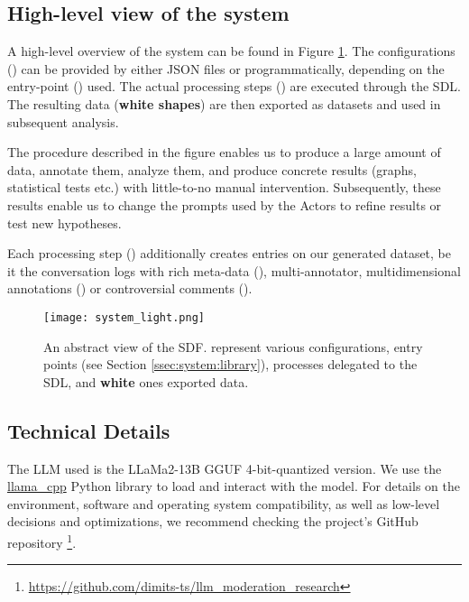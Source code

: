 \subsection{High-level view of the system}
\label{ssec:system:overview}

A high-level overview of the system can be found in Figure \ref{fig::system}. The configurations () can be provided by either \ac{JSON} files or programmatically, depending on the entry-point () used. The actual processing steps () are executed through the \ac{SDL}. The resulting data (\textbf{white shapes}) are then exported as datasets and used in subsequent analysis.

The procedure described in the figure enables us to produce a large amount of data, annotate them, analyze them, and produce concrete results (graphs, statistical tests etc.) with little-to-no manual intervention. Subsequently, these results enable us to change the prompts used by the Actors to refine results or test new hypotheses.

Each processing step () additionally creates entries on our generated dataset, be it the conversation logs with rich meta-data (), multi-annotator, multidimensional annotations () or controversial comments ().

\begin{figure}
	\centering
	\texttt{[image: system\_light.png]}
	\caption{An abstract view of the \ac{SDF}.  represent various configurations,  entry points (see Section \ref{ssec:system:library}),  processes delegated to the \ac{SDL}, and \textbf{white} ones exported data.}
	\label{fig::system}
\end{figure}



\subsection{Technical Details}
\label{ssec:system:details}

The LLM used is the LLaMa2-13B GGUF 4-bit-quantized version. We use the \href{https://github.com/abetlen/llama-cpp-python}{llama\_cpp} Python library to load and interact with the model. For details on the environment, software and operating system compatibility, as well as low-level decisions and optimizations, we recommend checking the project's GitHub repository \footnote{\url{https://github.com/dimits-ts/llm_moderation_research}}.

